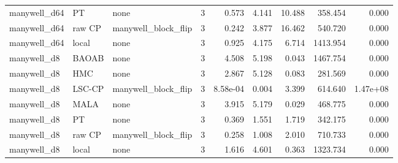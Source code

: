 \begin{table}[t]
{\begin{tabular}{llllrrrrr}
manywell\_d64 & PT & none & 3 & 0.573 & 4.141 & 10.488 & 358.454 & 0.000 \\
manywell\_d64 & raw CP & manywell\_block\_flip & 3 & 0.242 & 3.877 & 16.462 & 540.720 & 0.000 \\
manywell\_d64 & local & none & 3 & 0.925 & 4.175 & 6.714 & 1413.954 & 0.000 \\
manywell\_d8 & BAOAB & none & 3 & 4.508 & 5.198 & 0.043 & 1467.754 & 0.000 \\
manywell\_d8 & HMC & none & 3 & 2.867 & 5.128 & 0.083 & 281.569 & 0.000 \\
manywell\_d8 & LSC-CP & manywell\_block\_flip & 3 & 8.58e-04 & 0.004 & 3.399 & 614.640 & 1.47e+08 \\
manywell\_d8 & MALA & none & 3 & 3.915 & 5.179 & 0.029 & 468.775 & 0.000 \\
manywell\_d8 & PT & none & 3 & 0.369 & 1.551 & 1.719 & 342.175 & 0.000 \\
manywell\_d8 & raw CP & manywell\_block\_flip & 3 & 0.258 & 1.008 & 2.010 & 710.733 & 0.000 \\
manywell\_d8 & local & none & 3 & 1.616 & 4.601 & 0.363 & 1323.734 & 0.000 \\
\bottomrule
\end{tabular}%
}
\end{table}